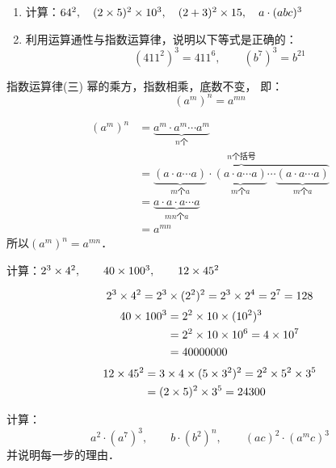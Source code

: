 \begin{ex}
    \begin{enumerate}
        \item 计算：$64^2,\quad (2\times5)^2\times10^3,\quad (2+3)^2\times15,\quad  a\cdot (abc)^3$
        \item 利用运算通性与指数运算律，说明以下等式是正确的：
        \[ (411^2)^3  = 411^6,\qquad (b^7)^3=b^{21} \]
    \end{enumerate}   
\end{ex}

\begin{blk}{指数运算律(三)}
幂的乘方，指数相乘，底数不变，
即：
\[(a^m)^n=a^{mn}\]
\end{blk}

\begin{note}
    \begin{align*}
        (a^m)^n&= \underbrace{a^m\cdot a^m\cdots a^m}_{\text{$n$个}}     \tag{乘方的意义}\\  
&=\overbrace{\underbrace{(a\cdot a\cdots a)}_{\text{$m$个$a$}}\cdot \underbrace{(a\cdot a\cdots a)}_{\text{$m$个$a$}}\cdots \underbrace{(a\cdot a\cdots a)}_{\text{$m$个$a$}}}^{\text{$n$个括号}}\\
&=\underbrace{a\cdot a\cdot a\cdots a}_{\text{$mn$个$a$}}\tag{乘法结合律}\\
&=a^{mn}\tag{乘方的意义}
    \end{align*}
    所以$(a^m)^n=a^{mn}$．
\end{note}

\begin{example}
    计算：$2^3\times 4^2,\qquad 40\times 100^3,\qquad 12\times 45^2$
\end{example}

\begin{solution}
   $$2^3\times 4^2=2^3\times (2^2)^2=2^3\times 2^4=2^7=128$$
   \[\begin{split}
       40\times 100^3&=2^2\times 10\times(10^2)^3\\
       &=2^2\times 10\times 10^6=4\times 10^7\\
       &=40000000
   \end{split}\]
   \[\begin{split}
    12\times 45^2&=3\times 4\times (5\times 3^2)^2=2^2\times 5^2\times 3^5\\
    &=(2\times 5)^2 \times 3^5=24300
   \end{split}\]
\end{solution}

\begin{example}
    计算：
    $$a^2\cdot (a^7)^3,\qquad b\cdot (b^2)^n,\qquad (ac)^2\cdot (a^m c)^3$$
    并说明每一步的理由．
\end{example}

